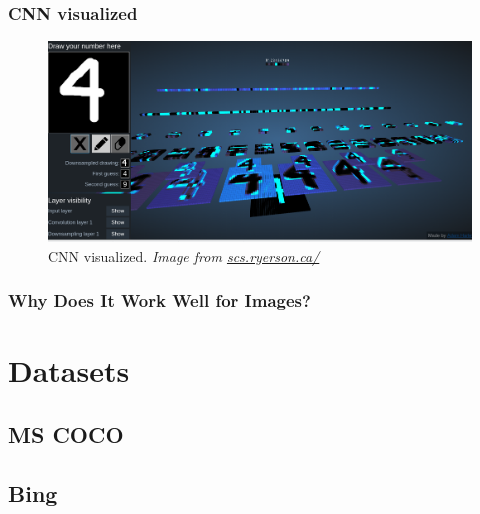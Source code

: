 \documentclass[xcolor=dvipsnames]{beamer}
\begin{document}
		\begin{frame}
			\frametitle{CNN visualized}
			\begin{figure}
				\includegraphics[width=\textwidth]{images/cnn_visual.png}
				\centering
				\caption{CNN visualized. \textit{Image from \href{http://scs.ryerson.ca/~aharley/vis/conv/}{scs.ryerson.ca/}} \cite{harley2015isvc}}
			\end{figure}
			
		\end{frame}
	
		\begin{frame}
			\frametitle{Why Does It Work Well for Images?}
			
		\end{frame}
	
	\section{Datasets}
		
		\begin{frame}
			\frametitle{}
			
		\end{frame}
	
		\subsection{MS COCO}
			
			\begin{frame}
				\frametitle{}
				
			\end{frame}
		
		\subsection{Bing}
			
\end{document}
